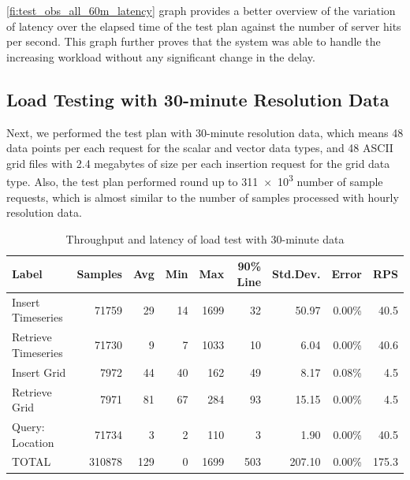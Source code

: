 \cref{fi:test_obs_all_60m_latency} graph provides a better overview of the variation of latency over the elapsed time of the test plan against the number of server hits per second. This graph further proves that the system was able to handle the increasing workload without any significant change in the delay. 


\subsection{Load Testing with 30-minute Resolution Data}
\label{subse:obs_test_plan_all_30min}

Next, we performed the test plan with 30-minute resolution data, which means 48 data points per each request for the scalar and vector data types, and 48 ASCII grid files with 2.4 megabytes of size per each insertion request for the grid data type. Also, the test plan performed round up to \num{311e3} number of sample requests, which is almost similar to the number of samples processed with hourly resolution data. 

\begin{table}[ht]
\caption{Throughput and latency of load test with 30-minute data}
\footnotesize
\begin{tabulary}{\linewidth}{|L|R|R|R|R|R|R|R|R|}
\hline
\textbf{Label} & \textbf{Samples} & \textbf{Avg} & \textbf{Min} & \textbf{Max} & \textbf{90\% Line} & \textbf{Std.Dev.} & \textbf{Error} & \textbf{RPS} \\ \hline
Insert Timeseries & 71759 & 29 & 14 & 1699 & 32 & 50.97 & 0.00\% & 40.5 \\ \hline
Retrieve Timeseries & 71730 & 9 & 7 & 1033 & 10 & 6.04 & 0.00\% & 40.6 \\ \hline
Insert Grid & 7972 & 44 & 40 & 162 & 49 & 8.17 & 0.08\% & 4.5 \\ \hline
Retrieve Grid & 7971 & 81 & 67 & 284 & 93 & 15.15 & 0.00\% & 4.5 \\ \hline
Query: Location & 71734 & 3 & 2 & 110 & 3 & 1.90 & 0.00\% & 40.5 \\ \hline
TOTAL & 310878 & 129 & 0 & 1699 & 503 & 207.10 & 0.00\% & 175.3 \\ \hline
\end{tabulary}
\label{tab:obs_all_30_min_summary}
\end{table}

